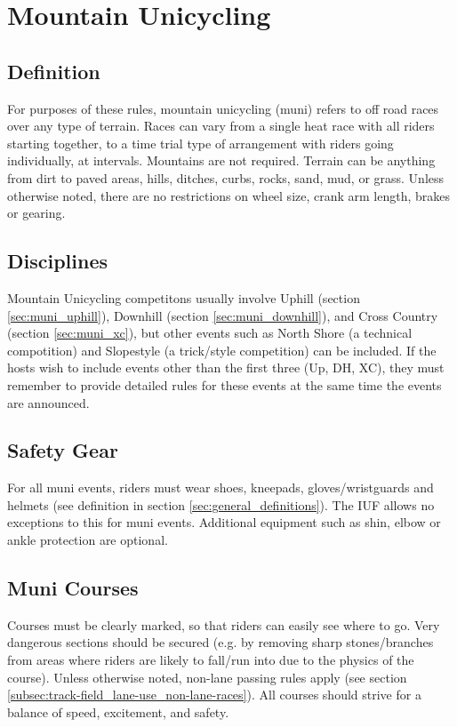 \chapter*{Mountain Unicycling \label{chap:muni}}

\section{Definition}
For purposes of these rules, mountain unicycling (muni) refers to off road races over any type of terrain.
Races can vary from a single heat race with all riders starting together, to a time trial type of arrangement with riders going individually, at intervals.
Mountains are not required.
Terrain can be anything from dirt to paved areas, hills, ditches, curbs, rocks, sand, mud, or grass.
Unless otherwise noted, there are no restrictions on wheel size, crank arm length, brakes or gearing.

\section{Disciplines}
Mountain Unicycling competitons usually involve Uphill (section \ref{sec:muni_uphill}), Downhill (section \ref{sec:muni_downhill}), and Cross Country (section \ref{sec:muni_xc}), but other events such as North Shore (a technical compotition) and Slopestyle (a trick/style competition) can be included.
If the hosts wish to include events other than the first three (Up, DH, XC), they must remember to provide detailed rules for these events at the same time the events are announced.

\section{Safety Gear}
For all muni events, riders must wear shoes, kneepads, gloves/wristguards and helmets (see definition in section \ref{sec:general_definitions}).
The IUF allows no exceptions to this for muni events.
Additional equipment such as shin, elbow or ankle protection are optional.

\section{Muni Courses}
Courses must be clearly marked, so that riders can easily see where to go.
Very dangerous sections should be secured (e.g. by removing sharp stones/branches from areas where riders are likely to fall/run into due to the physics of the course).
Unless otherwise noted, non-lane passing rules apply (see section \ref{subsec:track-field_lane-use_non-lane-races}).
All courses should strive for a balance of speed, excitement, and safety.


